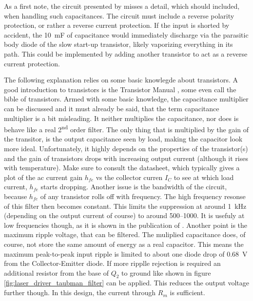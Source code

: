 As a first note, the circuit presented by \citeauthor{laser_driver_qcl_taubman} misses a detail, which should included, when handling such capacitances. The circuit must include a reverse polarity protection, or rather a reverse current protection. If the input is shorted by accident, the \qty{10}{\milli\farad} of capacitance would immediately discharge via the parasitic body diode of the slow start-up transistor, likely vaporizing everything in its path. This could be implemented by adding another transistor to act as a reverse current protection.

The following explanation relies on some basic knowlegde about transistors. A good introduction to transistors is the Transistor Manual \cite{transistor_bible}, some even call the bible of transistors. Armed with some basic knowledge, the capacitance multiplier can be discussed and it must already be said, that the term capacitance multiplier is a bit misleading. It neither multiplies the capacitance, nor does is behave like a real 2\textsuperscript{nd} order filter. The only thing that is multiplied by the gain of the transitor, is the output capacitance seen by load, making the capacitor look more ideal. Unfortunately, it  highly depends on the properties of the transistor(s) and the gain of transistors drops with increasing output current (although it rises with temperature). Make sure to consult the datasheet, which typically gives a plot of the ac current gain $h_{fe}$ vs the collector curren $I_C$ to see at which load current, $h_{fe}$ starts dropping. Another issue is the bandwidth of the circuit, because $h_{fe}$ of any transistor rolls off with frequency. The high frequency resonse of this filter then becomes constant. This limits the suppression at around \qty{1}{\kHz} (depending on the output current of course) to around \numrange{500}{1000}. It is usefuly at low frequencies though, as it is shown in the publication of \citeauthor{laser_driver_qcl_taubman}. Another point is the maximum ripple voltage, that can be filtered. The muliplied capacitance does, of course, not store the same amount of energy as a real capacitor. This means the maximum peak-to-peak input ripple is limited to about one diode drop of \qty{0.68}{\V} from the Collector-Emitter diode. If more ripplle rejection is required an additional resistor from the base of $Q_2$ to ground like shown in figure \ref{fig:laser_driver_taubman_filter} can be applied. This reduces the output voltage further though. In this design, the current through $R_m$ is sufficient.

